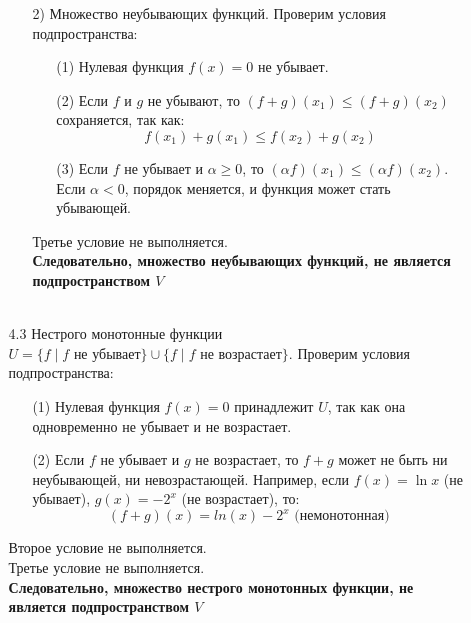 \documentclass[a4paper]{article}
\renewcommand{\geq}{\geqslant}
\renewcommand{\leq}{\leqslant}
\begin{document}
\begin{enumerate}
\begin{enumerate}
\begin{enumerate}
            \item[2)]Множество неубывающих функций. Проверим условия подпространства:
            \begin{enumerate}
                \item[(1)]Нулевая функция \( f(x) = 0 \) не убывает.
                \item[(2)]Если \( f \) и \( g \) не убывают, то \( (f + g)(x_1) \leq (f + g)(x_2) \) сохраняется, так как:
                $$ f(x_1) + g(x_1) \leq f(x_2) + g(x_2)$$
                \item[(3)]Если \( f \) не убывает и \( \alpha \geq 0 \), то \( (\alpha f)(x_1) \leq (\alpha f)(x_2) \). Если \( \alpha < 0 \), порядок меняется, и функция может стать убывающей.
            \end{enumerate}
            Третье условие не выполняется.\\
            \textbf{Следовательно, множество неубывающих функций, не является подпространством $V$}\\\\
        \end{enumerate}

        \item[4.3]Нестрого монотонные функции\\
        $U = \{f \mid f \text{ не убывает}\} \cup \{f \mid f \text{ не возрастает}\}.$
        Проверим условия подпространства:
        \begin{enumerate}
            \item[(1)]Нулевая функция \( f(x) = 0 \) принадлежит \( U \), так как она одновременно не убывает и не возрастает.
            \item[(2)]Если \( f \) не убывает и \( g \) не возрастает, то \( f + g \) может не быть ни неубывающей, ни невозрастающей. Например, если \( f(x) = \ln{x} \) (не убывает), \( g(x) = -2^x \) (не возрастает), то:
            $$(f + g)(x) = ln(x)-2^x \text{ (немонотонная)}$$
        \end{enumerate}
        Второе условие не выполняется.\\
        Третье условие не выполняется.\\
        \textbf{Следовательно, множество нестрого монотонных функции, не является подпространством $V$}\\\\
    \end{enumerate}


\end{enumerate}
\end{document}
